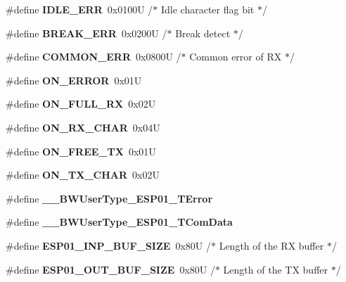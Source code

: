 \begin{DoxyCompactItemize}
\#define {\bfseries I\+D\+L\+E\+\_\+\+E\+RR}~0x0100\+U       /$\ast$ Idle character flag bit   $\ast$/
\item 
\mbox{\label{group___e_s_p01__module_ga0cb4d61ee3347eb62142ca0eb1d02a53}} 
\#define {\bfseries B\+R\+E\+A\+K\+\_\+\+E\+RR}~0x0200\+U       /$\ast$ Break detect              $\ast$/
\item 
\mbox{\label{group___e_s_p01__module_ga86e7d2a6a6227d9fbb84d459454c2359}} 
\#define {\bfseries C\+O\+M\+M\+O\+N\+\_\+\+E\+RR}~0x0800\+U       /$\ast$ Common error of R\+X       $\ast$/
\item 
\mbox{\label{group___e_s_p01__module_gab5034f048fef6a41e7901a4e34368f3d}} 
\#define {\bfseries O\+N\+\_\+\+E\+R\+R\+OR}~0x01U
\item 
\mbox{\label{group___e_s_p01__module_ga2cf6b6a2b8c83f7d1d7e6134c6bd9a4a}} 
\#define {\bfseries O\+N\+\_\+\+F\+U\+L\+L\+\_\+\+RX}~0x02U
\item 
\mbox{\label{group___e_s_p01__module_gad07f43952e300ba1e45521ce777c09d4}} 
\#define {\bfseries O\+N\+\_\+\+R\+X\+\_\+\+C\+H\+AR}~0x04U
\item 
\mbox{\label{group___e_s_p01__module_ga71d35387335972e4f6ae07ecccf27724}} 
\#define {\bfseries O\+N\+\_\+\+F\+R\+E\+E\+\_\+\+TX}~0x01U
\item 
\mbox{\label{group___e_s_p01__module_gaf02aa8bfc7e9b5338168db9ff9077c0d}} 
\#define {\bfseries O\+N\+\_\+\+T\+X\+\_\+\+C\+H\+AR}~0x02U
\item 
\mbox{\label{group___e_s_p01__module_ga03169e4722c5794be8229f16f383fa9f}} 
\#define {\bfseries \+\_\+\+\_\+\+B\+W\+User\+Type\+\_\+\+E\+S\+P01\+\_\+\+T\+Error}
\item 
\mbox{\label{group___e_s_p01__module_ga5650006ebb1be213d8ff124c5a0a9666}} 
\#define {\bfseries \+\_\+\+\_\+\+B\+W\+User\+Type\+\_\+\+E\+S\+P01\+\_\+\+T\+Com\+Data}
\item 
\mbox{\label{group___e_s_p01__module_gae746c07fc9eeaa6e5db642af1f699372}} 
\#define {\bfseries E\+S\+P01\+\_\+\+I\+N\+P\+\_\+\+B\+U\+F\+\_\+\+S\+I\+ZE}~0x80\+U      /$\ast$ Length of the R\+X buffer $\ast$/
\item 
\mbox{\label{group___e_s_p01__module_gaa605ccc0da73ddf0df3cdb589027e24f}} 
\#define {\bfseries E\+S\+P01\+\_\+\+O\+U\+T\+\_\+\+B\+U\+F\+\_\+\+S\+I\+ZE}~0x80\+U      /$\ast$ Length of the T\+X buffer $\ast$/
\end{DoxyCompactItemize}
